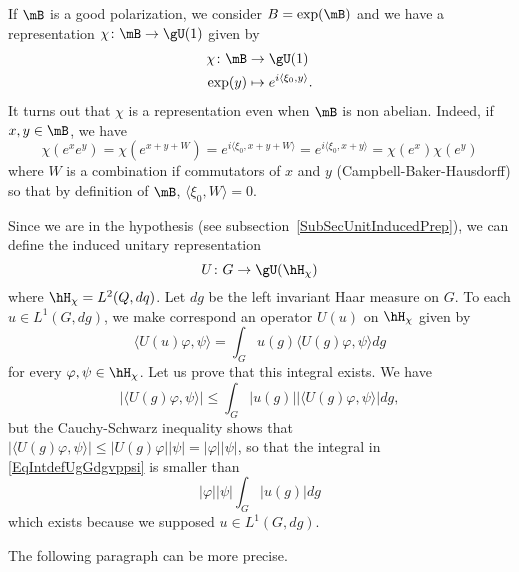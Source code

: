 If $\mB$ is a good polarization, we consider $B=\exp(\mB)$ and we have a representation $\chi\colon \mB\to \gU(1)$ given by
\begin{equation}
	\begin{aligned}
		\chi\colon \mB&\to \gU(1) \\
		\exp(y)&\mapsto  e^{i\langle \xi_0, y\rangle }.
	\end{aligned}
\end{equation}
It turns out that $\chi$ is a representation even when $\mB$ is non abelian. Indeed, if $x,y\in\mB$, we have
\begin{equation}
	\chi( e^{x} e^{y})=\chi( e^{x+y+W})= e^{i\langle \xi_0, x+y+W\rangle }= e^{i\langle \xi_0, x+y\rangle }= \chi( e^{x})\chi( e^{y})
\end{equation}
where $W$ is a combination if commutators of $x$ and $y$ (Campbell-Baker-Hausdorff) so that by definition of $\mB$, $\langle \xi_0, W\rangle =0$.

Since we are in the hypothesis (see subsection~\ref{SubSecUnitInducedPrep}), we can define the induced unitary representation
\begin{equation}
	U\colon G\to \gU(\hH_{\chi})
\end{equation}
where $\hH_{\chi}=L^2(Q,dq)$. Let $dg$ be the left invariant Haar measure on $G$.  To each $u\in L^1(G,dg)$, we make correspond an operator $U(u)$ on $\hH_{\chi}$ given by
\begin{equation}	\label{EqDefUudansHh}
	\langle U(u)\varphi, \psi\rangle =\int_Gu(g)\langle U(g)\varphi, \psi\rangle dg
\end{equation}
for every $\varphi,\psi\in\hH_{\chi}$. Let us prove that this integral exists. We have
\begin{equation}	\label{EqIntdefUgGdgvppsi}
		| \langle U(g)\varphi, \psi\rangle  |\leq\int_G| u(g) | |\langle U(g)\varphi, \psi\rangle  |dg,
\end{equation}
but the Cauchy-Schwarz inequality shows that $| \langle U(g)\varphi, \psi\rangle  |\leq| U(g)\varphi | |\psi |=| \varphi | |\psi |$, so that the integral in \eqref{EqIntdefUgGdgvppsi} is smaller than
\begin{equation}
	| \varphi | | \psi |  \int_G| u(g) |dg
\end{equation}
which exists because we supposed $u\in L^1(G,dg)$.

\begin{probleme}
	The following paragraph can be more precise.
\end{probleme}

